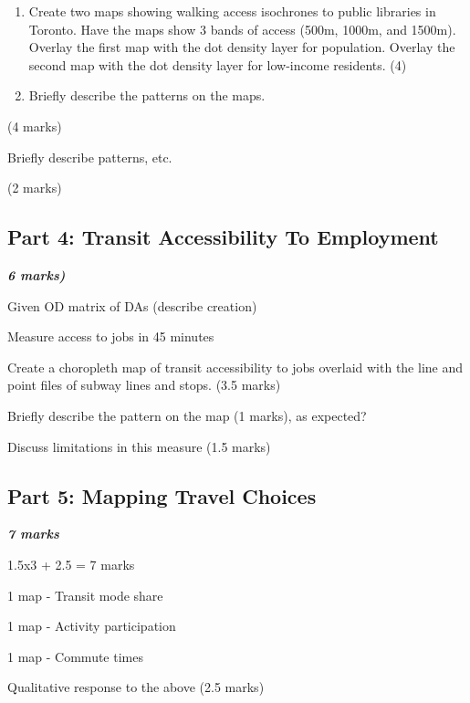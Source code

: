 \documentclass[11pt]{article}
\begin{document}
	
	\begin{enumerate}
		\item Create two maps showing walking access isochrones to public libraries in Toronto. Have the maps show 3 bands of access (500m, 1000m, and 1500m). Overlay the first map with the dot density layer for population. Overlay the second map with the dot density layer for low-income residents. (4)
		
		\item Briefly describe the patterns on the maps. 
	\end{enumerate}
	
	
	
	(4 marks)
	
	Briefly describe patterns, etc.
	
	(2 marks)

	
	
	
	\subsection*{Part 4: Transit Accessibility To Employment}
	
	\textbf{\textit{6 marks)}}
	
	
	Given OD matrix of DAs (describe creation)
	
	Measure access to jobs in 45 minutes
	
	Create a choropleth map of transit accessibility to jobs overlaid with the line and point files of subway lines and stops. (3.5 marks)
	
	Briefly describe the pattern on the map (1 marks), as expected?
	
	Discuss limitations in this measure (1.5 marks)
	
	
	
	
	\subsection*{Part 5: Mapping Travel Choices}
	
	\textbf{\textit{7 marks}}
	
	1.5x3 + 2.5 = 7 marks
	
	1 map - Transit mode share
	
	1 map - Activity participation
	
	1 map - Commute times
	
	Qualitative response to the above  (2.5 marks)

	
	
	
	
	
	
\end{document}
